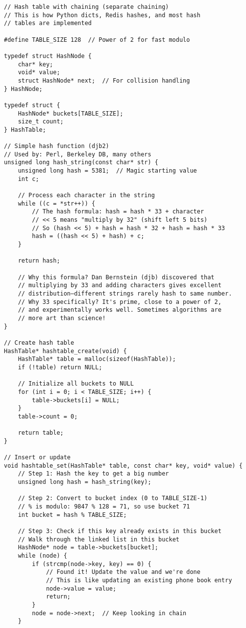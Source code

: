 \begin{lstlisting}
// Hash table with chaining (separate chaining)
// This is how Python dicts, Redis hashes, and most hash
// tables are implemented

#define TABLE_SIZE 128  // Power of 2 for fast modulo

typedef struct HashNode {
    char* key;
    void* value;
    struct HashNode* next;  // For collision handling
} HashNode;

typedef struct {
    HashNode* buckets[TABLE_SIZE];
    size_t count;
} HashTable;

// Simple hash function (djb2)
// Used by: Perl, Berkeley DB, many others
unsigned long hash_string(const char* str) {
    unsigned long hash = 5381;  // Magic starting value
    int c;

    // Process each character in the string
    while ((c = *str++)) {
        // The hash formula: hash = hash * 33 + character
        // << 5 means "multiply by 32" (shift left 5 bits)
        // So (hash << 5) + hash = hash * 32 + hash = hash * 33
        hash = ((hash << 5) + hash) + c;
    }

    return hash;

    // Why this formula? Dan Bernstein (djb) discovered that
    // multiplying by 33 and adding characters gives excellent
    // distribution—different strings rarely hash to same number.
    // Why 33 specifically? It's prime, close to a power of 2,
    // and experimentally works well. Sometimes algorithms are
    // more art than science!
}

// Create hash table
HashTable* hashtable_create(void) {
    HashTable* table = malloc(sizeof(HashTable));
    if (!table) return NULL;

    // Initialize all buckets to NULL
    for (int i = 0; i < TABLE_SIZE; i++) {
        table->buckets[i] = NULL;
    }
    table->count = 0;

    return table;
}

// Insert or update
void hashtable_set(HashTable* table, const char* key, void* value) {
    // Step 1: Hash the key to get a big number
    unsigned long hash = hash_string(key);

    // Step 2: Convert to bucket index (0 to TABLE_SIZE-1)
    // % is modulo: 9847 % 128 = 71, so use bucket 71
    int bucket = hash % TABLE_SIZE;

    // Step 3: Check if this key already exists in this bucket
    // Walk through the linked list in this bucket
    HashNode* node = table->buckets[bucket];
    while (node) {
        if (strcmp(node->key, key) == 0) {
            // Found it! Update the value and we're done
            // This is like updating an existing phone book entry
            node->value = value;
            return;
        }
        node = node->next;  // Keep looking in chain
    }


\end{lstlisting}
